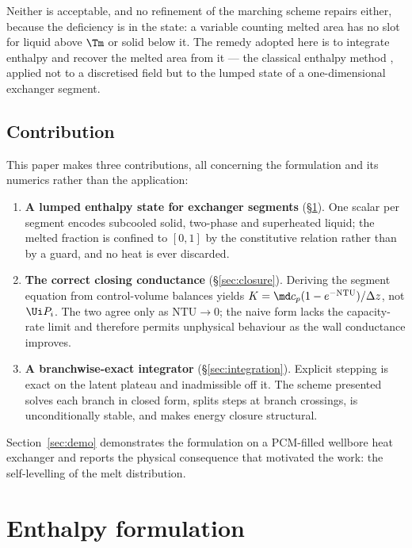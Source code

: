 Neither is acceptable, and no refinement of the marching scheme repairs either,
because the deficiency is in the state: a variable counting melted area has no
slot for liquid above $\Tm$ or solid below it. The remedy adopted here is to
integrate enthalpy and recover the melted area from it --- the classical
enthalpy method \cite{Voller1987,Alexiades1993}, applied not to a discretised
field but to the lumped state of a one-dimensional exchanger segment.

\subsection{Contribution}

This paper makes three contributions, all concerning the formulation and its
numerics rather than the application:

\begin{enumerate}[leftmargin=1.8em,itemsep=3pt]
\item \textbf{A lumped enthalpy state for exchanger segments}
  (\S\ref{sec:formulation}). One scalar per segment encodes subcooled solid,
  two-phase and superheated liquid; the melted fraction is confined to $[0,1]$
  by the constitutive relation rather than by a guard, and no heat is ever
  discarded.
\item \textbf{The correct closing conductance} (\S\ref{sec:closure}). Deriving
  the segment equation from control-volume balances yields
  $K=\md c_{p}(1-e^{-\mathrm{NTU}})/\Delta z$, not $\Ui P_{i}$. The two agree
  only as $\mathrm{NTU}\to0$; the naive form lacks the capacity-rate limit and
  therefore permits unphysical behaviour as the wall conductance improves.
\item \textbf{A branchwise-exact integrator} (\S\ref{sec:integration}).
  Explicit stepping is exact on the latent plateau and inadmissible off it. The
  scheme presented solves each branch in closed form, splits steps at branch
  crossings, is unconditionally stable, and makes energy closure structural.
\end{enumerate}

\noindent
Section~\ref{sec:demo} demonstrates the formulation on a PCM-filled wellbore
heat exchanger and reports the physical consequence that motivated the work: the
self-levelling of the melt distribution.

\section{Enthalpy formulation}
\label{sec:formulation}

